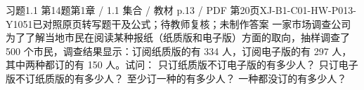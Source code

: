 \par\noindent\begin{minipage}{\linewidth}
\begin{bankitem}{习题1.1 第14题}{第1章 / 1.1 集合 / 教材 p.13 / PDF 第20页}{XJ-B1-C01-HW-P013-Y1051}{已对照原页转写题干及公式；待教师复核；未制作答案}
一家市场调查公司为了了解当地市民在阅读某种报纸（纸质版和电子版）方面的取向，抽样调查了 500 个市民，调查结果显示：订阅纸质版的有 334 人，订阅电子版的有 297 人，其中两种都订的有 150 人。试问：
只订纸质版不订电子版的有多少人？
只订电子版不订纸质版的有多少人？
至少订一种的有多少人？
一种都没订的有多少人？
\end{bankitem}
\end{minipage}\par\medskip
